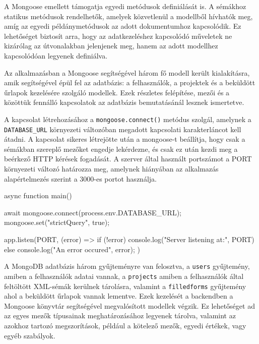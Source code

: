 A Mongoose emellett támogatja egyedi metódusok definiálását is. A sémákhoz statikus metódusok rendelhetők, amelyek közvetlenül a modellből hívhatók meg, amíg az egyedi példánymetódusok az adott dokumentumhoz kapcsolódik. Ez lehetőséget biztosít arra, hogy az adatkezeléshez kapcsolódó műveletek ne kizárólag az útvonalakban jelenjenek meg, hanem az adott modellhez kapcsolódóan legyenek definiálva. 

Az alkalmazásban a Mongoose segítségével három fő modell került kialakításra, amik segítségével épül fel az adatbázis: a felhasználók, a projektek és a beküldött űrlapok kezelésére szolgáló modellek. Ezek részletes felépítése, mezői és a közöttük fennálló kapcsolatok az adatbázis bemutatásánál lesznek ismertetve.

A kapcsolat létrehozásához a \texttt{mongoose.connect()} metódus szolgál, amelynek a \texttt{DATABASE\_URL} környezeti változóban megadott kapcsolati karakterláncot kell átadni. A kapcsolat sikeres létrejötte után a mongoose-t beállítja, hogy csak a sémákban szereplő mezőket engedje lekérdezne, és csak ez után kezdi meg a beérkező HTTP kérések fogadását. A szerver által használt portszámot a PORT környezeti változó határozza meg, amelynek hiányában az alkalmazás alapértelmezés szerint a 3000-es portot használja.
\begin{java}
async function main() {
    await mongoose.connect(process.env.DATABASE_URL);
    mongoose.set("strictQuery", true);

    app.listen(PORT, (error) => {
        if (!error) {
            console.log("Server listening at:", PORT)
        } else {
            console.log("An error occured", error);
        }
    })
}
\end{java}


A MongoDB adatbázis három gyűjteményre van felosztva, a \texttt{users} gyűjtemény, amiben a felhasználók adatai vannak, a \texttt{projects} amiben a felhasználók által feltöltött XML-sémák kerülnek tárolásra, valamint a \texttt{filledforms} gyűjtemény ahol a beküldött űrlapok vannak lementve. Ezek kezelését a backendben a Mongoose könyvtár segítségével megvalósított modellek végzik. Ez lehetőséget ad az egyes mezők típusainak meghatározásához legyenek tárolva, valamint az azokhoz tartozó megszorítások, például a kötelező mezők, egyedi értékek, vagy egyéb szabályok.

